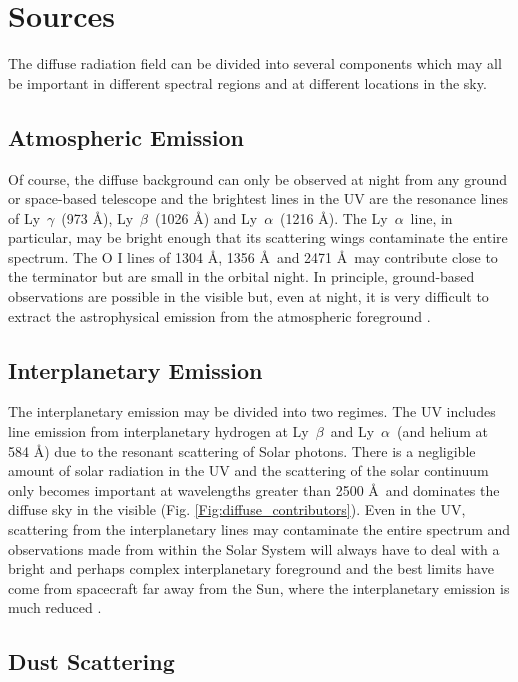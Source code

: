 \documentclass{iau}
\newcommand{\lya}{Ly~$\alpha$}
\newcommand{\lyb}{Ly~$\beta$}
\newcommand{\lyg}{Ly~$\gamma$}
\begin{document}
\section{Sources}

The diffuse radiation field can be divided into several components which may all be important in different spectral regions and at different locations in the sky.

\subsection{Atmospheric Emission}

Of course, the diffuse background can only be observed at night from any ground or space-based telescope and the brightest lines in the UV are the resonance lines of \lyg\ (973 \AA), \lyb\ (1026 \AA) and \lya\ (1216 \AA). The \lya\ line, in particular, may be bright enough that its scattering wings contaminate the entire spectrum. The O I lines of 1304 \AA, 1356 \AA\ and 2471 \AA\ may contribute close to the terminator but are small in the orbital night. In principle, ground-based observations are possible in the visible but, even at night, it is very difficult to extract the astrophysical emission from the atmospheric foreground \citep{Mattila_EBL2019}.

\subsection{Interplanetary Emission}

The interplanetary emission may be divided into two regimes. The UV includes line emission from interplanetary hydrogen at \lyb\ and \lya\ (and helium at 584 \AA) due to the resonant scattering of Solar photons. There is a negligible amount of solar radiation in the UV \citep{Mount_sun1985} and the scattering of the solar continuum only becomes important at wavelengths greater than 2500 \AA\ and dominates the diffuse sky in the visible (Fig. \ref{Fig:diffuse_contributors}). Even in the UV, scattering from the interplanetary lines may contaminate the entire spectrum \citep{Murthyvoy_all} and observations  made from within the Solar System will always have to deal with a bright and perhaps complex interplanetary foreground and the best limits have come from spacecraft far away from the Sun, where the interplanetary emission is much reduced \citep{Zemcov_lorri_2017}.

\subsection{Dust Scattering}
\end{document}
